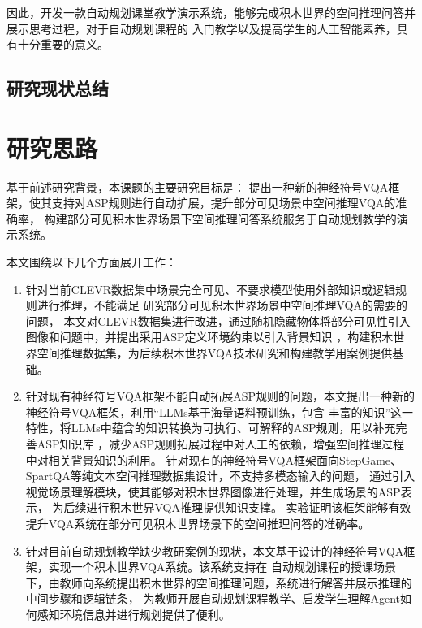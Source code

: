 因此，开发一款自动规划课堂教学演示系统，能够完成积木世界的空间推理问答并展示思考过程，对于自动规划课程的
入门教学以及提高学生的人工智能素养，具有十分重要的意义。
\subsection{研究现状总结}


\section{研究思路}
基于前述研究背景，本课题的主要研究目标是：
提出一种新的神经符号VQA框架，使其支持对ASP规则进行自动扩展，提升部分可见场景中空间推理VQA的准确率，
构建部分可见积木世界场景下空间推理问答系统服务于自动规划教学的演示系统。

本文围绕以下几个方面展开工作：
\begin{enumerate}[nosep]
\item 针对当前CLEVR数据集中场景完全可见、不要求模型使用外部知识或逻辑规则进行推理，不能满足
研究部分可见积木世界场景中空间推理VQA的需要的问题，
本文对CLEVR数据集进行改进，通过随机隐藏物体将部分可见性引入图像和问题中，并提出采用ASP定义环境约束以引入背景知识
，构建积木世界空间推理数据集，为后续积木世界VQA技术研究和构建教学用案例提供基础。
\item 针对现有神经符号VQA框架不能自动拓展ASP规则的问题，本文提出一种新的神经符号VQA框架，利用“LLMs基于海量语料预训练，包含
丰富的知识”这一特性，将LLMs中蕴含的知识转换为可执行、可解释的ASP规则，用以补充完善ASP知识库
，减少ASP规则拓展过程中对人工的依赖，增强空间推理过程中对相关背景知识的利用。
针对现有的神经符号VQA框架面向StepGame、SpartQA等纯文本空间推理数据集设计，不支持多模态输入的问题，
通过引入视觉场景理解模块，使其能够对积木世界图像进行处理，并生成场景的ASP表示，
为后续进行积木世界VQA推理提供知识支撑。
实验证明该框架能够有效提升VQA系统在部分可见积木世界场景下的空间推理问答的准确率。
\item 针对目前自动规划教学缺少教研案例的现状，本文基于设计的神经符号VQA框架，实现一个积木世界VQA系统。该系统支持在
自动规划课程的授课场景下，由教师向系统提出积木世界的空间推理问题，系统进行解答并展示推理的中间步骤和逻辑链条，
为教师开展自动规划课程教学、启发学生理解Agent如何感知环境信息并进行规划提供了便利。
\end{enumerate}

